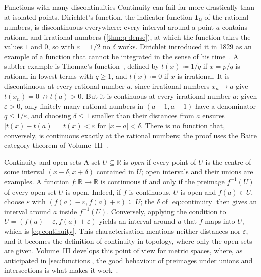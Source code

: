 \begin{note}{Functions with many discontinuities}
Continuity can fail far more drastically than at isolated points. Dirichlet's function, the indicator function $\mathbf 1_{\mathbb Q}$ of the rational numbers, is discontinuous everywhere: every interval around a point $a$ contains rational and irrational numbers (\cref{thm:q-dense}), at which the function takes the values $1$ and $0$, so with $\varepsilon=1/2$ no $\delta$ works. Dirichlet introduced it in 1829 as an example of a function that cannot be integrated in the sense of his time~\cite{dirichlet1829}. A subtler example is Thomae's function~\cite{thomae1875}, defined by $t(x)\coloneqq1/q$ if $x=p/q$ is rational in lowest terms with $q\ge1$, and $t(x)\coloneqq0$ if $x$ is irrational. It is discontinuous at every rational number $a$, since irrational numbers $x_n\to a$ give $t(x_n)=0\not\to t(a)>0$. But it is continuous at every irrational number $a$: given $\varepsilon>0$, only finitely many rational numbers in $(a-1,a+1)$ have a denominator $q\le1/\varepsilon$, and choosing $\delta\le1$ smaller than their distances from $a$ ensures $|t(x)-t(a)|=t(x)<\varepsilon$ for $|x-a|<\delta$. There is no function that, conversely, is continuous exactly at the rational numbers; the proof uses the Baire category theorem of Volume~III~\cite{abbott2015}.
\end{note}

\begin{note}{Continuity and open sets}
A set $U\subseteq\mathbb R$ is \emph{open} if every point of $U$ is the centre of some interval $(x-\delta,x+\delta)$ contained in $U$; open intervals and their unions are examples. A function $f\colon\mathbb R\to\mathbb R$ is continuous if and only if the preimage $f^{-1}(U)$ of every open set $U$ is open. Indeed, if $f$ is continuous, $U$ is open and $f(a)\in U$, choose $\varepsilon$ with $(f(a)-\varepsilon,f(a)+\varepsilon)\subseteq U$; the $\delta$ of \eqref{eq:continuity} then gives an interval around $a$ inside $f^{-1}(U)$. Conversely, applying the condition to $U=(f(a)-\varepsilon,f(a)+\varepsilon)$ yields an interval around $a$ that $f$ maps into $U$, which is \eqref{eq:continuity}. This characterisation mentions neither distances nor $\varepsilon$, and it becomes the definition of continuity in topology, where only the open sets are given. Volume~III develops this point of view for metric spaces, where, as anticipated in \cref{sec:functions}, the good behaviour of preimages under unions and intersections is what makes it work~\cite{rudin1976}.
\end{note}

